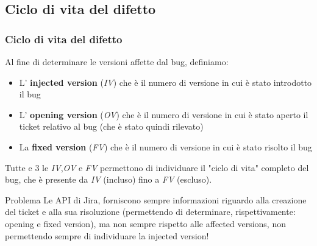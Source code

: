 \documentclass{beamer}
\begin{document}
\subsection{Ciclo di vita del difetto}
\begin{frame}
	\frametitle{Ciclo di vita del difetto}
	
	\fontsize{10pt}{10pt}\selectfont
	
	Al fine di determinare le versioni affette dal bug, definiamo:
	\begin{itemize}
		\item L' \textbf{injected version} (\textit{IV})
		che è il numero di versione in cui è stato introdotto il bug
		\item L' \textbf{opening version} (\textit{OV}) 
		che è il numero di versione in cui è stato aperto il ticket relativo al bug (che è stato quindi rilevato)
		\item La \textbf{fixed version} (\textit{FV}) 
		che è il numero di versione in cui è stato risolto il bug
	\end{itemize}
	
	\begin{center}
	\end{center}
	
	Tutte e 3 le \textit{IV},\textit{OV} e \textit{FV} permettono di individuare il "ciclo di vita" completo del
	bug, che è presente da \textit{IV} (incluso) fino a \textit{FV} (escluso).
	\begin{alertblock}{Problema}
	Le API di Jira, forniscono sempre informazioni riguardo alla creazione del ticket e alla sua risoluzione
	(permettendo di determinare, rispettivamente: opening e fixed version), 
	ma non sempre rispetto alle affected versions, non permettendo sempre di individuare la injected version!
	\end{alertblock}
\end{frame}
\end{document}
